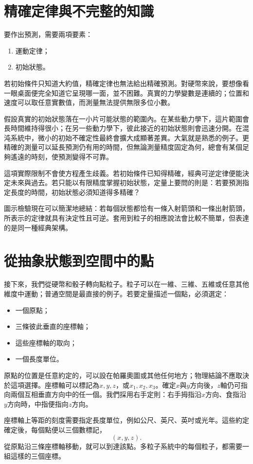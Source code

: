 \section{精確定律與不完整的知識}

要作出預測，需要兩項要素：
\begin{enumerate}
  \item 運動定律；
  \item 初始狀態。
\end{enumerate}
若初始條件只知道大約值，精確定律也無法給出精確預測。對硬幣來說，要想像看一眼桌面便完全知道它呈現哪一面，並不困難。真實的力學變數是連續的；位置和速度可以取任意實數值，而測量無法提供無限多位小數。

假設真實的初始狀態落在一小片可能狀態的範圍內。在某些動力學下，這片範圍會長時間維持得很小；在另一些動力學下，彼此接近的初始狀態則會迅速分開。在混沌系統中，微小的初始不確定性最終會擴大成顯著差異。大氣就是熟悉的例子。更精確的測量可以延長預測仍有用的時間，但無論測量精度固定為何，總會有某個足夠遙遠的時刻，使預測變得不可靠。

這項實際限制不會使方程產生歧義。若初始條件已知得精確，經典可逆定律便能決定未來與過去。若只能以有限精度掌握初始狀態，定量上要問的則是：若要預測指定長度的時間，初始狀態必須知道得多精確？

圖示檢驗現在可以簡潔地總結：若每個狀態都恰有一條入射箭頭和一條出射箭頭，所表示的定律就具有決定性且可逆。套用到粒子的相應說法會比較不簡單，但表達的是同一種經典架構。

\section{從抽象狀態到空間中的點}

接下來，我們從硬幣和骰子轉向點粒子。粒子可以在一維、三維、五維或任意其他維度中運動；普通空間是最直接的例子。若要定量描述一個點，必須選定：
\begin{itemize}
  \item 一個原點；
  \item 三條彼此垂直的座標軸；
  \item 這些座標軸的取向；
  \item 一個長度單位。
\end{itemize}
原點的位置是任意約定的，可以設在帕羅奧圖或其他任何地方；物理結論不應取決於這項選擇。座標軸可以標記為\(x,y,z\)，或\(x_1,x_2,x_3\)。確定\(x\)與\(y\)方向後，\(z\)軸仍可指向兩個互相垂直方向中的任一個。我們採用右手定則：右手拇指沿\(x\)方向、食指沿\(y\)方向時，中指便指向\(z\)方向。

座標軸上等距的刻度需要指定長度單位，例如公尺、英尺、英吋或光年。這些約定確定後，每個點便以三個數標記，
\begin{equation}
  (x,y,z).
\end{equation}
從原點沿三條座標軸移動，就可以到達該點。多粒子系統中的每個粒子，都需要一組這樣的三個座標。

